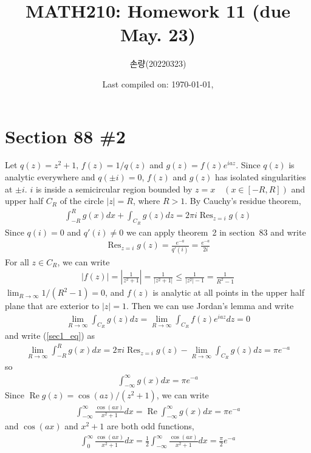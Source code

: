\documentclass{scrartcl}
\title{MATH210: Homework 11 (due May. 23)}
\author{손량(20220323)}
\date{Last compiled on: \today, \currenttime}
\newcommand{\real}{\operatorname{Re}}
\DeclareMathOperator*{\Res}{Res}
\begin{document}
\maketitle

\section{Section 88 \#2}
Let \(q(z) = z^2 + 1,\, f(z) = 1 / q(z)\) and \(g(z) = f(z) e^{iaz}\).
Since \(q(z)\) is analytic everywhere and \(q(\pm i) = 0\), \(f(z)\) and \(g(z)\) has isolated singularities at \(\pm i\).
\(i\) is inside a semicircular region bounded by \(z = x \quad (x \in [-R, R])\) and upper half \(C_R\) of the circle \(|z| = R\), where \(R > 1\).
By Cauchy's residue theorem,
\begin{align}\label{sec1_eq}
  \int^R_{-R} g(x) dx + \int_{C_R} g(z) dz = 2\pi i \Res_{z = i} g(z)
\end{align}
Since \(q(i) = 0\) and \(q'(i) \not = 0\) we can apply theorem~2 in section~83 and write
\begin{align*}
  \Res_{z = i} g(z) = \frac{e^{-a}}{q'(i)} = \frac{e^{-a}}{2i}
\end{align*}
For all \(z \in C_R\), we can write
\begin{align*}
  |f(z)| = \left| \frac{1}{z^2 + 1} \right| = \frac{1}{|z^2 + 1|} \leq \frac{1}{|z^2| - 1} = \frac{1}{R^2 - 1}
\end{align*}
\(\lim_{R \to \infty} 1 / (R^2 - 1) = 0\), and \(f(z)\) is analytic at all points in the upper half plane that are exterior to \(|z| = 1\).
Then we can use Jordan's lemma and write
\begin{align*}
  \lim_{R \to \infty} \int_{C_R} g(z) dz = \lim_{R \to \infty} \int_{C_R} f(z) e^{iaz} dz = 0
\end{align*}
and write (\ref{sec1_eq}) as
\begin{align*}
  \lim_{R \to \infty} \int^R_{-R} g(x) dx
  = 2\pi i \Res_{z = i} g(z) - \lim_{R \to \infty} \int_{C_R} g(z) dz
  = \pi e^{-a}
\end{align*}
so
\begin{align*}
  \int^\infty_{-\infty} g(x) dx = \pi e^{-a}
\end{align*}
Since \(\real g(z) = \cos (az) / (z^2 + 1)\), we can write
\begin{align*}
  \int^\infty_{-\infty} \frac{\cos (ax)}{x^2 + 1} dx = \real \int^\infty_{-\infty} g(x) dx = \pi e^{-a}
\end{align*}
and \(\cos (ax)\) and \(x^2 + 1\) are both odd functions,
\begin{align*}
  \int^\infty_0 \frac{\cos (ax)}{x^2 + 1} dx = \frac{1}{2} \int^\infty_{-\infty} \frac{\cos (ax)}{x^2 + 1} dx = \frac{\pi}{2} e^{-a}
\end{align*}
\end{document}

